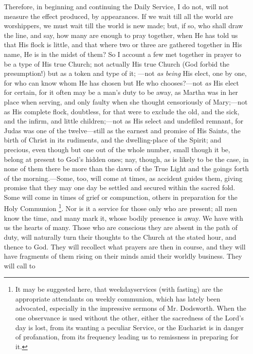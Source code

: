 Therefore, in beginning and continuing the Daily Service, I do not,
will not measure the effect produced, by appearances. If we wait till
all the world are worshippers, we must wait till the world is new
made; but, if so, who shall draw the line, and say, how many are
enough to pray together, when He has told us that His flock is little,
and that where two or three are gathered together in His name, He is
in the midst of them? So I account a few met together in prayer to be
a type of His true Church; not actually His true Church (God forbid
the presumption!) but as a token and type of it; —not \emph{as being}
His elect, one by one, for who can know whom He has chosen but He who
chooses?—not \emph{as} His elect for certain, for it often may be a
man's duty to be away, as Martha was in her place when serving, and
only faulty when she thought censoriously of Mary;—not as His
complete flock, doubtless, for that were to exclude the old, and the
sick, and the infirm, and little children;—not as His select and
undefiled remnant, for Judas was one of the twelve—still as the
earnest and promise of His Saints, the birth of Christ in its
rudiments, and the dwelling-place of the Spirit; and precious, even
though but one out of the whole number, small though it be, belong at
present to God's hidden ones; nay, though, as is likely to be the
case, in none of them there be more than the dawn of the True Light
and the goings forth of the morning.—Some, too, will come at times,
as accident guides them, giving promise that they may one day be
settled and secured within the sacred fold. Some will come in times of
grief or compunction, others in preparation for the Holy Communion \footnote{It may be suggested here, that weekday\emph{}services
(with fasting) are the appropriate attendants on weekly communion,
which has lately been advocated, especially in the impressive sermons
of Mr. Dodsworth. When the one observance is used without the other,
either the sacredness of the Lord's day is lost, from its wanting a
peculiar Service, or the Eucharist is in danger of profanation, from
its frequency leading us to remissness in preparing for it.}. Nor is it a service for those only who are present; all men
know the time, and many mark it, whose bodily presence is away. We
have with us the hearts of many. Those who are conscious they are
absent in the path of duty, will naturally turn their thoughts to the
Church at the stated hour, and thence to God. They will recollect
what
prayers are then in course, and they will have fragments of them
rising on their minds amid their worldly business. They will call to
